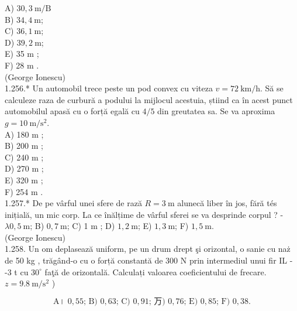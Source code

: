 {A) $30,3 \mathrm{~m} / \mathrm{B}$\\
B) $34,4 \mathrm{~m}$;\\
C) $36,1 \mathrm{~m}$;\\
D) $39,2 \mathrm{~m}$;\\
E) 35 m ;\\
F) 28 m .\\
(George Ionescu)\\
1.256.* Un automobil trece peste un pod convex cu viteza $v=72 \mathrm{~km} / \mathrm{h}$. Să se calculeze raza de curbură a podului la mijlocul acestuia, știind ca în acest punct automobilul apasă cu o forță egală cu $4 / 5$ din greutatea sa. Se va aproxima $g=10 \mathrm{~m} / \mathrm{s}^{2}$.\\
A) 180 m ;\\
B) 200 m ;\\
C) 240 m ;\\
D) 270 m ;\\
E) 320 m ;\\
F) 254 m .\\
1.257.* De pe vârful unei sfere de rază $R=3 \mathrm{~m}$ alunecă liber în jos, fără tés inițială, un mic corp. La ce înălțime de vârful sferei se va desprinde corpul ? - $\lambda 0,5 \mathrm{~m}$; B) $0,7 \mathrm{~m}$; C) 1 m ; D) $1,2 \mathrm{~m}$; E) $1,3 \mathrm{~m}$; F) $1,5 \mathrm{~m}$.\\
(George Ionescu)\\
1.258. Un om deplasează uniform, pe un drum drept şi orizontal, o sanie cu naż de 50 kg , trăgând-o cu o forță constantă de 300 N prin intermediul unui fir IL - -3 t cu $30^{\circ}$ faţă de orizontală. Calculați valoarea coeficientului de frecare. $z=9.8 \mathrm{~m} / \mathrm{s}^{2}$ )

$$
\text { A। } 0,55 \text {; B) } 0,63 \text {; C) } 0,91 \text {; 万) } 0,76 \text {; E) } 0,85 \text {; F) } 0,38 \text {. }
$$

}
